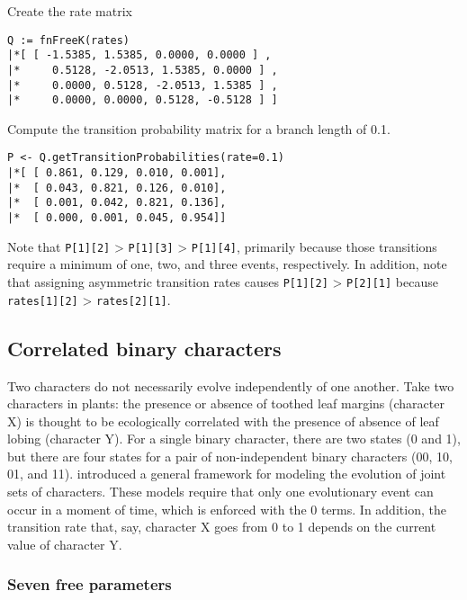 Create the rate matrix

{\tt \begin{snugshade*}
\begin{lstlisting}
Q := fnFreeK(rates)
|*[ [ -1.5385, 1.5385, 0.0000, 0.0000 ] ,
|*     0.5128, -2.0513, 1.5385, 0.0000 ] ,
|*     0.0000, 0.5128, -2.0513, 1.5385 ] ,
|*     0.0000, 0.0000, 0.5128, -0.5128 ] ]
\end{lstlisting}
\end{snugshade*}}

Compute the transition probability matrix for a branch length of 0.1.

{\tt \begin{snugshade*}
\begin{lstlisting}
P <- Q.getTransitionProbabilities(rate=0.1)
|*[ [ 0.861, 0.129, 0.010, 0.001],
|*  [ 0.043, 0.821, 0.126, 0.010],
|*  [ 0.001, 0.042, 0.821, 0.136],
|*  [ 0.000, 0.001, 0.045, 0.954]]
\end{lstlisting}
\end{snugshade*}}

Note that {\tt P[1][2]} > {\tt P[1][3]} > {\tt P[1][4]}, primarily because those transitions require a minimum of one, two, and three events, respectively.
In addition, note that assigning asymmetric transition rates causes {\tt P[1][2]} > {\tt P[2][1]} because {\tt rates[1][2]} > {\tt rates[2][1]}.


\subsection{Correlated binary characters}

Two characters do not necessarily evolve independently of one another.
Take two characters in plants: the presence or absence of toothed leaf margins (character X) is thought to be ecologically correlated with the presence of absence of leaf lobing (character Y).
For a single binary character, there are two states (0 and 1), but there are four states for a pair of non-independent binary characters (00, 10, 01, and 11).
\citet{pagel04} introduced a general framework for modeling the evolution of joint sets of characters.
These models require that only one evolutionary event can occur in a moment of time, which is enforced with the 0 terms.
In addition, the transition rate that, say, character X goes from 0 to 1 depends on the current value of character Y.

\subsubsection{Seven free parameters}

